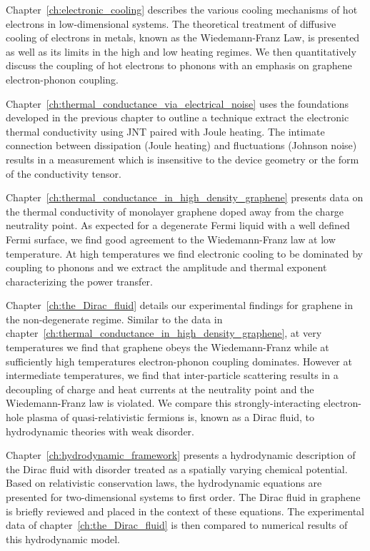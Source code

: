 Chapter~\ref{ch:electronic_cooling} describes the various cooling mechanisms of hot electrons in low-dimensional systems. The  theoretical treatment of diffusive cooling of electrons in metals, known as the Wiedemann-Franz Law, is presented as well as its limits in the high and low heating regimes. We then quantitatively discuss the coupling of hot electrons to phonons with an emphasis on graphene electron-phonon coupling. 

Chapter~\ref{ch:thermal_conductance_via_electrical_noise} uses the foundations developed in the previous chapter to outline a technique extract the electronic thermal conductivity using JNT paired with Joule heating. The intimate connection between dissipation (Joule heating) and fluctuations (Johnson noise) results in a measurement which is insensitive to the device geometry or the form of the conductivity tensor.

Chapter~\ref{ch:thermal_conductance_in_high_density_graphene} presents data on the thermal conductivity of monolayer graphene doped away from the charge neutrality point. As expected for a degenerate Fermi liquid with a well defined Fermi surface, we find good agreement to the Wiedemann-Franz law at low temperature. At high temperatures we find electronic cooling to be dominated by coupling to phonons and we extract the amplitude and thermal exponent characterizing the power transfer. 

Chapter~\ref{ch:the_Dirac_fluid} details our experimental findings for graphene in the non-degenerate regime. Similar to the data in chapter~\ref{ch:thermal_conductance_in_high_density_graphene}, at very temperatures we find that graphene obeys the Wiedemann-Franz while at sufficiently high temperatures electron-phonon coupling dominates. However at intermediate temperatures, we find that inter-particle scattering results in a decoupling of charge and heat currents at the neutrality point and the Wiedemann-Franz law is violated. We compare this strongly-interacting electron-hole plasma of quasi-relativistic fermions is, known as a Dirac fluid, to hydrodynamic theories with weak disorder.

Chapter~\ref{ch:hydrodynamic_framework} presents a hydrodynamic description of the Dirac fluid with disorder treated as a spatially varying chemical potential. Based on relativistic conservation laws, the hydrodynamic equations are presented for two-dimensional systems to first order. The Dirac fluid in graphene is briefly reviewed and placed in the context of these equations. The experimental data of chapter~\ref{ch:the_Dirac_fluid} is then compared to numerical results of this hydrodynamic model.

